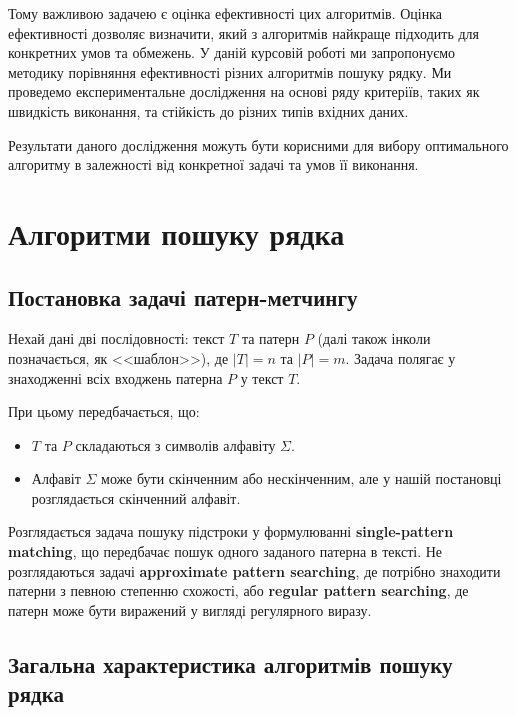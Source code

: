 \documentclass[a4paper,14pt]{extarticle} %
\begin{document}
Тому важливою задачею є оцінка ефективності цих алгоритмів. Оцінка ефективності дозволяє визначити, який з алгоритмів найкраще підходить для конкретних умов та обмежень. У даній курсовій роботі ми запропонуємо методику порівняння ефективності різних алгоритмів пошуку рядку. Ми проведемо експериментальне дослідження на основі ряду критеріїв, таких як швидкість виконання, та стійкість до різних типів вхідних даних.

Результати даного дослідження можуть бути корисними для вибору оптимального алгоритму в залежності від конкретної задачі та умов її виконання.


    \newpage



    \section{Алгоритми пошуку рядка}

	\subsection{Постановка задачі патерн-метчингу}

	Нехай дані дві послідовності: текст \( T \) та патерн \( P \) (далі також інколи позначається, як <<шаблон>>), де \( |T| = n \) та \( |P| = m \). Задача полягає у знаходженні всіх входжень патерна \( P \) у текст \( T \).

При цьому передбачається, що:
\begin{itemize}
    \item \( T \) та \( P \) складаються з символів алфавіту \( \Sigma \).
    \item Алфавіт \( \Sigma \) може бути скінченним або нескінченним, але у нашій постановці розглядається скінченний алфавіт.
\end{itemize}


Розглядається задача пошуку підстроки у формулюванні \textbf{single-pattern matching}, що передбачає пошук одного заданого патерна в тексті. Не розглядаються задачі \textbf{approximate pattern searching}, де потрібно знаходити патерни з певною степенню схожості, або \textbf{regular pattern searching}, де патерн може бути виражений у вигляді регулярного виразу.


	\subsection{Загальна характеристика алгоритмів пошуку рядка}
\end{document}
